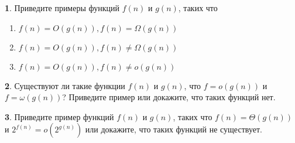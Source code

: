 \documentclass[10pt, oneside]{article}
\theoremstyle{definition}
\newtheorem{problem}{}
\begin{document}
\begin{problem}
Приведите примеры функций $f(n)$ и $g(n)$, таких что
\begin{enumerate}
    \item $f(n) = O(g(n)), f(n) = \Omega(g(n))$
    \item $f(n) = O(g(n)), f(n) \neq \Omega(g(n))$
    \item $f(n) = O(g(n)), f(n) \neq o(g(n))$
\end{enumerate}
\end{problem}

\begin{problem}
Существуют ли такие функции $f(n)$ и $g(n)$, что $f = o(g(n))$ и $f =
\omega(g(n))$? Приведите пример или докажите, что таких функций нет.
\end{problem}

\begin{problem}
Приведите пример функций $f(n)$ и $g(n)$, таких что $f(n) = \Theta(g(n))$ и
$2^{f(n)} = o(2^{g(n)})$ или докажите, что таких функций не существует.
\end{problem}
\end{document}
